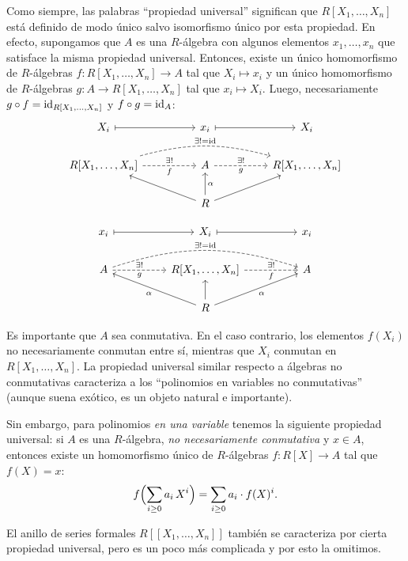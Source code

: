 Como siempre, las palabras ``propiedad universal'' significan
que $R [X_1,\ldots,X_n]$ está definido de modo único salvo isomorfismo único
por esta propiedad. En efecto, supongamos que $A$ es una $R$-álgebra con algunos
elementos $x_1,\ldots,x_n$ que satisface la misma propiedad universal. Entonces,
existe un único homomorfismo de $R$-álgebras $f\colon R [X_1,\ldots,X_n] \to A$
tal que $X_i \mapsto x_i$ y un único homomorfismo de $R$-álgebras
$g\colon A \to R [X_1,\ldots,X_n]$ tal que $x_i \mapsto X_i$. Luego,
necesariamente $g\circ f = \mathrm{id}_{R [X_1,\ldots,X_n]}$ y $f\circ g = \mathrm{id}_{A}$:
\[ \begin{tikzcd}
    X_i \ar[|->]{rr} && x_i \ar[|->]{rr} && X_i \\
    R [X_1,\ldots,X_n] \ar[dashed]{rr}{\exists !}[swap]{f} \ar[dashed,bend left=15]{rrrr}{\exists ! = \idid} && A \ar[dashed]{rr}{\exists !}[swap]{g} && R [X_1,\ldots,X_n] \\
    & & R\ar{ull}\ar{u}[swap]{\alpha}\ar{urr}
\end{tikzcd} \]

\[ \begin{tikzcd}
    x_i \ar[|->]{rr} && X_i \ar[|->]{rr} && x_i \\
    A \ar[dashed]{rr}{\exists !}[swap]{g} \ar[dashed,bend left=18]{rrrr}{\exists ! = \idid} && R [X_1,\ldots,X_n] \ar[dashed]{rr}{\exists !}[swap]{f} && A \\
    & & R\ar{ull}{\alpha}\ar{u}\ar{urr}[swap]{\alpha}
\end{tikzcd} \]

\begin{comentario}
  Es importante que $A$ sea conmutativa. En el caso contrario, los elementos
  $f (X_i)$ no necesariamente conmutan entre sí, mientras que $X_i$ conmutan
  en $R [X_1,\ldots,X_n]$. La propiedad universal similar respecto a álgebras
  no conmutativas caracteriza a los ``polinomios en variables no conmutativas''
  (aunque suena exótico, es un objeto natural e importante).

  Sin embargo, para polinomios \emph{en una variable} tenemos la siguiente
  propiedad universal: si $A$ es una $R$-álgebra, \emph{no necesariamente
    conmutativa} y $x\in A$, entonces existe un homomorfismo único
  de $R$-álgebras $f\colon R[X] \to A$ tal que $f (X) = x$:
  $$f \Bigl(\sum_{i\ge 0} a_i\,X^i\Bigr) = \sum_{i\ge 0} a_i\cdot f (X)^i.$$
\end{comentario}

\begin{comentario}
  \label{comentario:prop-univ-de-R[X]}
  El anillo de series formales $R [\![X_1,\ldots,X_n]\!]$ también se caracteriza
  por cierta propiedad universal, pero es un poco más complicada y por esto
  la omitimos.
\end{comentario}

